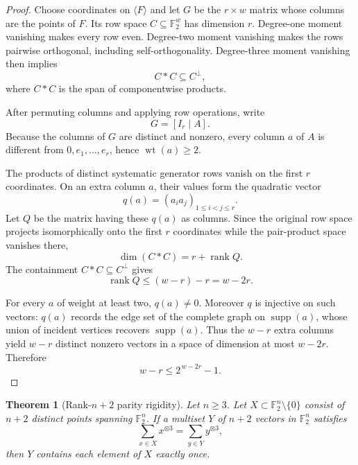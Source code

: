 \documentclass[11pt]{article}
\newtheorem{theorem}{Theorem}
\theoremstyle{definition}
\newcommand{\F}{\mathbb F}
\newcommand{\wt}{\operatorname{wt}}
\newcommand{\rank}{\operatorname{rank}}
\newcommand{\supp}{\operatorname{supp}}
\begin{document}
\begin{proof}
Choose coordinates on \(\langle F\rangle\) and let \(G\) be the \(r\times w\) matrix whose columns are the points of \(F\). Its row space \(C\subseteq\F_2^w\) has dimension \(r\). Degree-one moment vanishing makes every row even. Degree-two moment vanishing makes the rows pairwise orthogonal, including self-orthogonality. Degree-three moment vanishing then implies
\[
C*C\subseteq C^\perp,
\]
where \(C*C\) is the span of componentwise products.

After permuting columns and applying row operations, write
\[
G=[I_r\mid A].
\]
Because the columns of \(G\) are distinct and nonzero, every column \(a\) of \(A\) is different from \(0,e_1,\ldots,e_r\), hence \(\wt(a)\ge2\).

The products of distinct systematic generator rows vanish on the first \(r\) coordinates. On an extra column \(a\), their values form the quadratic vector
\[
q(a)=(a_i a_j)_{1\le i<j\le r}.
\]
Let \(Q\) be the matrix having these \(q(a)\) as columns. Since the original row space projects isomorphically onto the first \(r\) coordinates while the pair-product space vanishes there,
\[
\dim(C*C)=r+\rank Q.
\]
The containment \(C*C\subseteq C^\perp\) gives
\[
\rank Q\le (w-r)-r=w-2r.
\]

For every \(a\) of weight at least two, \(q(a)\ne0\). Moreover \(q\) is injective on such vectors: \(q(a)\) records the edge set of the complete graph on \(\supp(a)\), whose union of incident vertices recovers \(\supp(a)\). Thus the \(w-r\) extra columns yield \(w-r\) distinct nonzero vectors in a space of dimension at most \(w-2r\). Therefore
\[
w-r\le2^{\,w-2r}-1.
\]
\end{proof}

\begin{theorem}[Rank-\(n+2\) parity rigidity]\label{thm:parity}
Let \(n\ge3\). Let \(X\subset\F_2^n\setminus\{0\}\) consist of \(n+2\) distinct points spanning \(\F_2^n\). If a multiset \(Y\) of \(n+2\) vectors in \(\F_2^n\) satisfies
\[
\sum_{x\in X}x^{\otimes3}
=
\sum_{y\in Y}y^{\otimes3},
\]
then \(Y\) contains each element of \(X\) exactly once.
\end{theorem}
\end{document}
